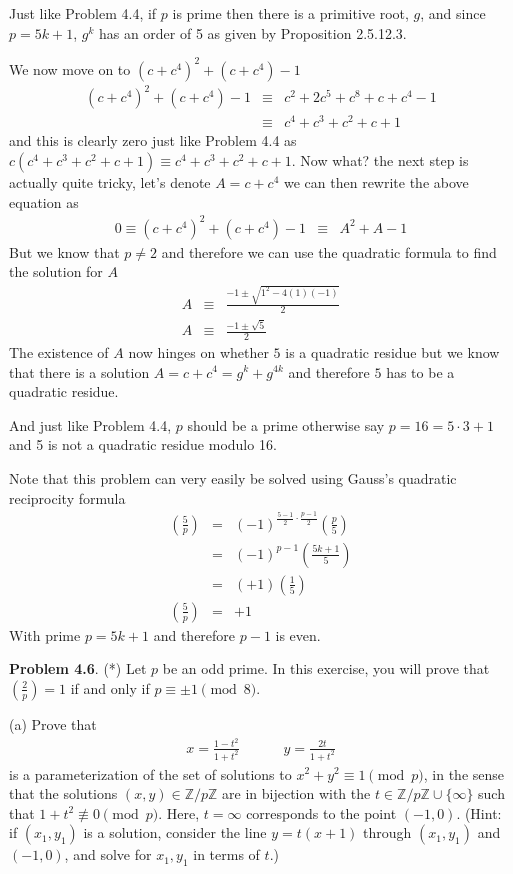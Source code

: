 \documentclass[aps,preprint,preprintnumbers,nofootinbib,showpacs,prd]{revtex4-1}
\newcommand{\nbea}{\begin{eqnarray*}}
\newcommand{\neea}{\end{eqnarray*}}
\begin{document}
Just like Problem 4.4, if $p$ is prime then there is a primitive root, $g$, and since $p = 5k + 1$, $g^k$ has an order of 5 as given by Proposition 2.5.12.3.

We now move on to $(c + c^4)^2 + (c + c^4) - 1$
%
\nbea
(c + c^4)^2 + (c + c^4) - 1 & \equiv & c^2 + 2c^5 + c^8 + c + c^4 - 1 \\
& \equiv & c^4 + c^3 + c^2 + c + 1
\neea
%
and this is clearly zero just like Problem 4.4 as $c(c^4 + c^3 + c^2 + c + 1) \equiv c^4 + c^3 + c^2 + c + 1$. Now what? the next step is actually quite tricky, let's denote $A = c + c^4$ we can then rewrite the above equation as
%
\nbea
0 \equiv (c + c^4)^2 + (c + c^4) - 1 & \equiv & A^2 + A - 1
\neea
%
But we know that $p \neq 2$ and therefore we can use the quadratic formula to find the solution for $A$
%
\nbea
A & \equiv & \frac{-1 \pm \sqrt{1^2 -4(1)(-1)}}{2} \\
A & \equiv & \frac{-1 \pm \sqrt{5}}{2}
\neea
%
The existence of $A$ now hinges on whether $5$ is a quadratic residue but we know that there is a solution $A = c + c^4 = g^k + g^{4k}$ and therefore $5$ has to be a quadratic residue.

And just like Problem 4.4, $p$ should be a prime otherwise say $p = 16 = 5\cdot3 + 1$ and 5 is not a quadratic residue modulo 16.

Note that this problem can very easily be solved using Gauss's quadratic reciprocity formula
%
\nbea
\left ( \frac{5}{p} \right ) & = & (-1)^{\frac{5-1}{2}\cdot \frac{p-1}{2}} \left ( \frac{p}{5} \right ) \\
& = & (-1)^{p-1} \left ( \frac{5k + 1}{5} \right ) \\
& = & (+1)\left ( \frac{1}{5} \right ) \\
\left ( \frac{5}{p} \right ) & = & +1
\neea
%
With prime $p = 5k + 1$ and therefore $p-1$ is even.

{\bf Problem 4.6}. (*) Let $p$ be an odd prime. In this exercise, you will prove that $\left ( \frac{2}{p} \right) =1$ if and only if $p \equiv \pm 1 \pmod{8}$. 

(a) Prove that
%
\nbea
x = \frac{1-t^2}{1 + t^2} & ~~~~~~~ & y = \frac{2t} {1 + t^2} 
\neea
%
is a parameterization of the set of solutions to $x^2 + y^2 \equiv 1 \pmod {p}$, in the sense that the solutions $(x,y) \in \mathbb{Z}/p\mathbb{Z}$ are in bijection with the $t \in \mathbb{Z}/p\mathbb{Z}\cup\{\infty\}$ such that $1+t^2 \not\equiv 0 \pmod{p}$. Here, $t = \infty$ corresponds to the point $(-1,0)$. (Hint: if $(x_1,y_1)$ is a solution, consider the line $y = t(x+1)$ through $(x_1,y_1)$ and $(-1,0)$, and solve for $x_1,y_1$ in terms of $t$.)
\end{document}
